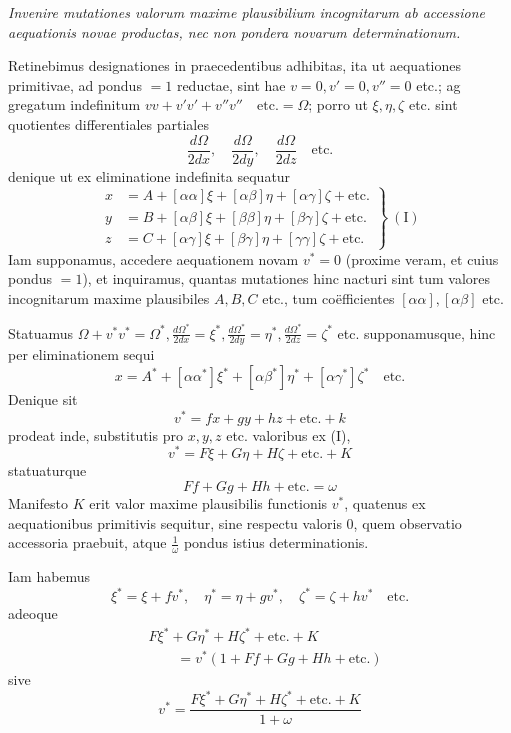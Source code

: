 \textit{Invenire mutationes valorum maxime plausibilium incognitarum ab accessione aequationis novae productas, nec non pondera novarum determinationum.}

Retinebimus designationes in praecedentibus adhibitas, ita ut aequationes primitivae, ad pondus \(=1\) reductae, sint hae \(v=0,\allowbreak v'=0,\allowbreak v''=0\) etc.; ag%
gregatum indefinitum \(vv+v'v'+v''v''\quad\text{etc.}=\Omega\); porro ut \(\xi,\eta,\zeta\) etc. sint quotientes differentiales partiales
\[
\frac{d\Omega}{2dx},\quad\frac{d\Omega}{2dy},\quad\frac{d\Omega}{2dz}\quad\text{etc.}
\]
denique ut ex eliminatione indefinita sequatur
\[
\left.\begin{aligned}
x&=A+[\alpha\alpha]\xi+[\alpha\beta]\eta+[\alpha\gamma]\zeta+\text{etc.}\\
y&=B+[\alpha\beta]\xi+[\beta\beta]\eta+[\beta\gamma]\zeta+\text{etc.}\\
z&=C+[\alpha\gamma]\xi+[\beta\gamma]\eta+[\gamma\gamma]\zeta+\text{etc.}
\end{aligned}\right\}\ (\mathrm{I})
\]
Iam supponamus, accedere aequationem novam \(v^*=0\) (proxime veram, et cuius pondus \(=1\)), et inquiramus, quantas mutationes hinc nacturi sint tum valores incognitarum maxime plausibiles \(A,B,C\) etc., tum coëfficientes \([\alpha\alpha],[\alpha\beta]\) etc.

Statuamus \(\Omega+v^*v^*=\Omega^*,\allowbreak\frac{d\Omega^*}{2dx}=\xi^*,\allowbreak\frac{d\Omega^*}{2dy}=\eta^*,\allowbreak\frac{d\Omega^*}{2dz}=\zeta^*\) etc. supponamusque, hinc per eliminationem sequi
\[
x=A^*+[\alpha\alpha^*]\xi^*+[\alpha\beta^*]\eta^*+[\alpha\gamma^*]\zeta^*\quad\text{etc.}
\]
Denique sit
\[
v^*=fx+gy+hz+\text{etc.}+k
\]
prodeat inde, substitutis pro \(x,y,z\) etc. valoribus ex (I),
\[
v^*=F\xi+G\eta+H\zeta+\text{etc.}+K
\]
statuaturque
\[
Ff+Gg+Hh+\text{etc.}=\omega
\]
Manifesto \(K\) erit valor maxime plausibilis functionis \(v^*\), quatenus ex aequationibus primitivis sequitur, sine respectu valoris \(0\), quem observatio accessoria praebuit, atque \(\frac1\omega\) pondus istius determinationis.

Iam habemus
\[
\xi^*=\xi+fv^*,\quad\eta^*=\eta+gv^*,\quad\zeta^*=\zeta+hv^*\quad\text{etc.}
\]
adeoque
\[
\begin{aligned}
&F\xi^*+G\eta^*+H\zeta^*+\text{etc.}+K\\
&\qquad=v^*(1+Ff+Gg+Hh+\text{etc.})
\end{aligned}
\]
sive
\[
v^*=\frac{F\xi^*+G\eta^*+H\zeta^*+\text{etc.}+K}{1+\omega}
\]
